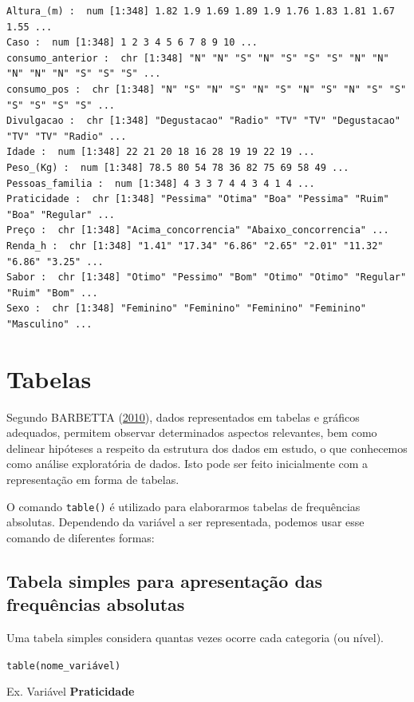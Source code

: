 \documentclass[12pt,portuguese,oneside]{book}
\begin{document}
\begin{verbatim}
Altura_(m) :  num [1:348] 1.82 1.9 1.69 1.89 1.9 1.76 1.83 1.81 1.67 1.55 ...
Caso :  num [1:348] 1 2 3 4 5 6 7 8 9 10 ...
consumo_anterior :  chr [1:348] "N" "N" "S" "N" "S" "S" "S" "N" "N" "N" "N" "N" "S" "S" "S" ...
consumo_pos :  chr [1:348] "N" "S" "N" "S" "N" "S" "N" "S" "N" "S" "S" "S" "S" "S" "S" ...
Divulgacao :  chr [1:348] "Degustacao" "Radio" "TV" "TV" "Degustacao" "TV" "TV" "Radio" ...
Idade :  num [1:348] 22 21 20 18 16 28 19 19 22 19 ...
Peso_(Kg) :  num [1:348] 78.5 80 54 78 36 82 75 69 58 49 ...
Pessoas_familia :  num [1:348] 4 3 3 7 4 4 3 4 1 4 ...
Praticidade :  chr [1:348] "Pessima" "Otima" "Boa" "Pessima" "Ruim" "Boa" "Regular" ...
Preço :  chr [1:348] "Acima_concorrencia" "Abaixo_concorrencia" ...
Renda_h :  chr [1:348] "1.41" "17.34" "6.86" "2.65" "2.01" "11.32" "6.86" "3.25" ...
Sabor :  chr [1:348] "Otimo" "Pessimo" "Bom" "Otimo" "Otimo" "Regular" "Ruim" "Bom" ...
Sexo :  chr [1:348] "Feminino" "Feminino" "Feminino" "Feminino" "Masculino" ...
\end{verbatim}

\section{Tabelas}\label{tabelas}

Segundo BARBETTA (\protect\hyperlink{ref-barbetta1988}{2010}), dados
representados em tabelas e gráficos adequados, permitem observar
determinados aspectos relevantes, bem como delinear hipóteses a respeito
da estrutura dos dados em estudo, o que conhecemos como análise
exploratória de dados. Isto pode ser feito inicialmente com a
representação em forma de tabelas.

O comando \texttt{table()} é utilizado para elaborarmos tabelas de
frequências absolutas. Dependendo da variável a ser representada,
podemos usar esse comando de diferentes formas:

\subsection{Tabela simples para apresentação das frequências
absolutas}\label{tabela-simples-para-apresentacao-das-frequencias-absolutas}

Uma tabela simples considera quantas vezes ocorre cada categoria (ou
nível).

\texttt{table(nome\_variável)}

Ex. Variável \textbf{Praticidade}
\end{document}
